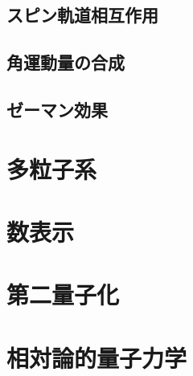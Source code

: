 \documentclass[a4paper]{jsreport}
\begin{document}
        \section{スピン軌道相互作用}


        \section{角運動量の合成}


        \section{ゼーマン効果}
            

    \chapter{多粒子系}
    \chapter{数表示}
    \chapter{第二量子化}
    \chapter{相対論的量子力学}
        
\end{document}
